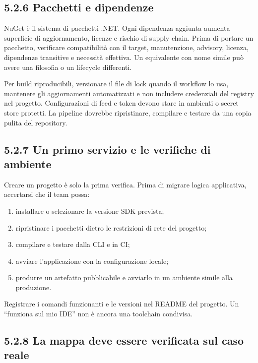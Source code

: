 \documentclass[
  italian,
  10pt,
]{book}
\providecommand{\tightlist}{%
  \setlength{\itemsep}{0pt}\setlength{\parskip}{0pt}}
\begin{document}
\subsection{5.2.6 Pacchetti e dipendenze}\label{pacchetti-e-dipendenze}

NuGet è il sistema di pacchetti .NET. Ogni dipendenza aggiunta aumenta
superficie di aggiornamento, licenze e rischio di supply chain. Prima di
portare un pacchetto, verificare compatibilità con il target,
manutenzione, advisory, licenza, dipendenze transitive e necessità
effettiva. Un equivalente con nome simile può avere una filosofia o un
lifecycle differenti.

Per build riproducibili, versionare il file di lock quando il workflow
lo usa, mantenere gli aggiornamenti automatizzati e non includere
credenziali del registry nel progetto. Configurazioni di feed e token
devono stare in ambienti o secret store protetti. La pipeline dovrebbe
ripristinare, compilare e testare da una copia pulita del repository.

\subsection{5.2.7 Un primo servizio e le verifiche di
ambiente}\label{un-primo-servizio-e-le-verifiche-di-ambiente}

Creare un progetto è solo la prima verifica. Prima di migrare logica
applicativa, accertarsi che il team possa:

\begin{enumerate}
\def\labelenumi{\arabic{enumi}.}
\tightlist
\item
  installare o selezionare la versione SDK prevista;
\item
  ripristinare i pacchetti dietro le restrizioni di rete del progetto;
\item
  compilare e testare dalla CLI e in CI;
\item
  avviare l'applicazione con la configurazione locale;
\item
  produrre un artefatto pubblicabile e avviarlo in un ambiente simile
  alla produzione.
\end{enumerate}

Registrare i comandi funzionanti e le versioni nel README del progetto.
Un ``funziona sul mio IDE'' non è ancora una toolchain condivisa.

\subsection{5.2.8 La mappa deve essere verificata sul caso
reale}\label{la-mappa-deve-essere-verificata-sul-caso-reale}
\end{document}
